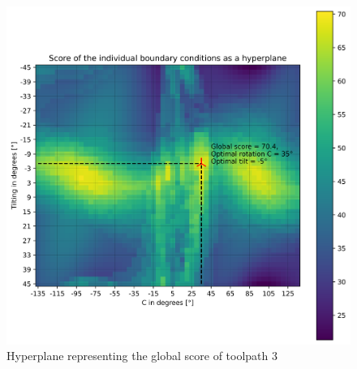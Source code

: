 \begin{figure}[H]
	\centerline{\includegraphics[width=1\textwidth]{figures/best_2D_3.png}}
	\caption{Hyperplane representing the global score of toolpath 3}
	\label{best_2D}
\end{figure}

